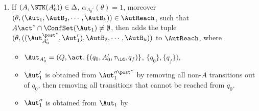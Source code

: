 {\begin{minipage}{0.95\textwidth}
\begin{enumerate}
\begin{itemize}
            \item $\theta' = \aname_i\aname_1\dots\aname_{i-1}\aname_{i+1}\dots\aname_k$,
            \item $\Aut_{A_0'} = (Q, \act, \{(q_0, A_0', \tau_{\id}, q_f)\}$, $\{q_0\},\{q_f\})$,
            \item $\AutB_1'$ is obtained from $\AutB_1$ by 
                removing all non-$A$ transitions out of $q_0$, then removing all transitions that cannot be reached from $q_0$.
        \end{itemize}
        
    \item If $(A,\STK(A_0')) \in\Delta$, $\alpha_{A_0'}(\theta) = 1$, moreover $(\theta, (\Aut_1,\AutB_2,\cdots,\AutB_k)) \in \AutReach$, such that $A\act^*\cap\ConfSet(\Aut_1)\neq \emptyset$, 
        then adds the tuple $(\theta, ((\Aut_{A_0'}^{\post^*},\Aut_{1}'),\AutB_2,\cdots,\AutB_k))$ to $\AutReach$, where
        \begin{itemize}
            \item $\Aut_{A_0'} = (Q, \act, \{(q_0, A_0', \tau_{\id}, q_f)\}$, $\{q_0\},\{q_f\})$,
            \item $\Aut_1'$ is obtained from $\Aut_1''^{\post^*}$ by removing all non-$A$ transitions out of $q_0$, then removing all transitions that cannot be reached from $q_0$.
            \item $\Aut_1''$ is obtained from $\Aut_1$ by 

\end{itemize}
\end{enumerate}
\end{minipage}}
